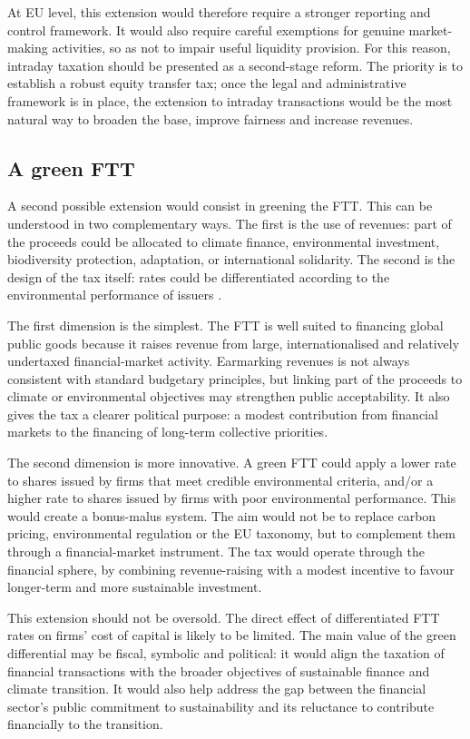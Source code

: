 \documentclass[../../main]{subfiles}
\begin{document}
At EU level, this extension would therefore require a stronger reporting and control framework. It would also require careful exemptions for genuine market-making activities, so as not to impair useful liquidity provision. For this reason, intraday taxation should be presented as a second-stage reform. The priority is to establish a robust equity transfer tax; once the legal and administrative framework is in place, the extension to intraday transactions would be the most natural way to broaden the base, improve fairness and increase revenues.

\subsection{A green FTT}

A second possible extension would consist in greening the FTT. This can be understood in two complementary ways. The first is the use of revenues: part of the proceeds could be allocated to climate finance, environmental investment, biodiversity protection, adaptation, or international solidarity. The second is the design of the tax itself: rates could be differentiated according to the environmental performance of issuers \citep{CapelleBlancardGreenFTT}.

The first dimension is the simplest. The FTT is well suited to financing global public goods because it raises revenue from large, internationalised and relatively undertaxed financial-market activity. Earmarking revenues is not always consistent with standard budgetary principles, but linking part of the proceeds to climate or environmental objectives may strengthen public acceptability. It also gives the tax a clearer political purpose: a modest contribution from financial markets to the financing of long-term collective priorities.

The second dimension is more innovative. A green FTT could apply a lower rate to shares issued by firms that meet credible environmental criteria, and/or a higher rate to shares issued by firms with poor environmental performance. This would create a bonus-malus system. The aim would not be to replace carbon pricing, environmental regulation or the EU taxonomy, but to complement them through a financial-market instrument. The tax would operate through the financial sphere, by combining revenue-raising with a modest incentive to favour longer-term and more sustainable investment.

This extension should not be oversold. The direct effect of differentiated FTT rates on firms' cost of capital is likely to be limited. The main value of the green differential may be fiscal, symbolic and political: it would align the taxation of financial transactions with the broader objectives of sustainable finance and climate transition. It would also help address the gap between the financial sector's public commitment to sustainability and its reluctance to contribute financially to the transition.
\end{document}
